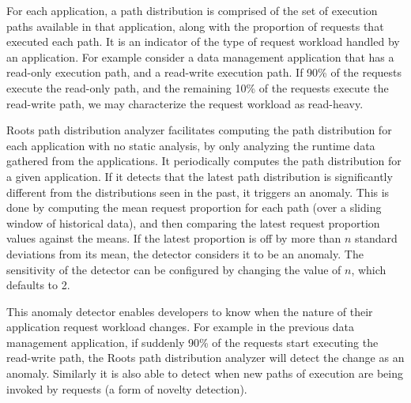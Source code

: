 For each application,
a path distribution is comprised of the set of execution paths available in
that application, along with the proportion of requests that executed each path.
It is an indicator of the type of request workload handled by an application.
For example consider a data management application that has a read-only execution path, and a read-write 
execution path. If 90\% of the requests execute the read-only path, and the remaining 10\% of the requests
execute the read-write path, we may characterize the request workload as read-heavy.

%
 
Roots path distribution analyzer facilitates computing the path distribution for each application
with no static analysis, by only analyzing the runtime data gathered from the applications.
It periodically computes the path distribution for a given application.
If it detects that the latest path distribution is significantly different from the distributions seen in the 
past, it triggers an anomaly. This is done by computing the mean request proportion for each path
(over a sliding window of historical data),
and then comparing the latest request proportion values against the means. If the latest proportion
is off by more than $n$ standard deviations from its mean, the detector considers it to be an
anomaly. The sensitivity of the detector can be configured by changing the value of $n$, which
defaults to 2. 

This anomaly detector enables developers to know when the nature of their application request
workload changes. For example in the previous data management application, if suddenly 90\%
of the requests start executing the read-write path, the Roots path distribution analyzer will
detect the change as an anomaly. Similarly it is also able to detect when new paths of execution
are being invoked by requests (a form of novelty detection).

